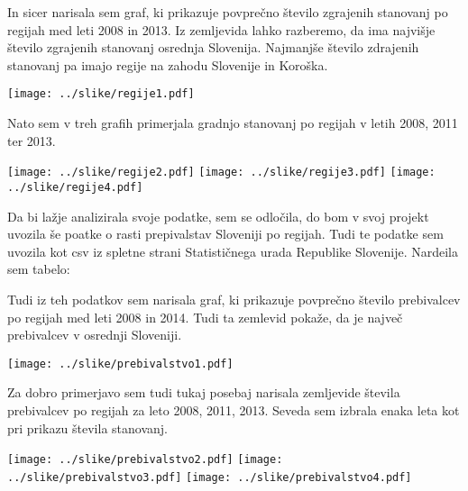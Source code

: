 \documentclass[11pt,a4paper]{article}
\begin{document}
In sicer narisala sem graf, ki prikazuje povprečno število zgrajenih stanovanj po regijah med leti 2008 in 2013. Iz zemljevida lahko razberemo, da ima najvišje število zgrajenih stanovanj osrednja Slovenija. Najmanjše število zdrajenih stanovanj pa imajo regije na zahodu Slovenije in Koroška.

\texttt{[image: ../slike/regije1.pdf]}

Nato sem v treh grafih primerjala gradnjo stanovanj po regijah v letih 2008, 2011 ter 2013.

\texttt{[image: ../slike/regije2.pdf]}
\vspace{5mm}
\texttt{[image: ../slike/regije3.pdf]}
\vspace{5mm}
\texttt{[image: ../slike/regije4.pdf]}

Da bi lažje analizirala svoje podatke, sem se odločila, do bom v svoj projekt uvozila še poatke o rasti prepivalstav Sloveniji po regijah. Tudi te podatke sem uvozila kot csv iz spletne strani Statističnega urada Republike Slovenije. Nardeila sem tabelo:



Tudi iz teh podatkov sem narisala graf, ki prikazuje povprečno število prebivalcev po regijah med leti 2008 in 2014. Tudi ta zemlevid pokaže, da je največ prebivalcev v osrednji Sloveniji.

\texttt{[image: ../slike/prebivalstvo1.pdf]}

Za dobro primerjavo sem tudi tukaj posebaj narisala zemljevide števila prebivalcev po regijah za leto 2008, 2011, 2013. Seveda sem izbrala enaka leta kot pri prikazu števila stanovanj.

\texttt{[image: ../slike/prebivalstvo2.pdf]}
\vspace{5mm}
\texttt{[image: ../slike/prebivalstvo3.pdf]}
\vspace{5mm}
\texttt{[image: ../slike/prebivalstvo4.pdf]}



\end{document}
